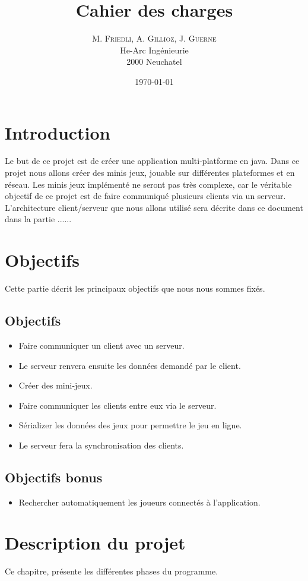 \documentclass{report}
\title{Cahier des charges}
\author{M. \textsc{Friedli}, A. \textsc{Gillioz}, J. \textsc{Guerne}\\
He-Arc Ingénieurie\\
2000 Neuchatel}
\date{\today{}}
\begin{document}
\maketitle{}
\chapter{Introduction}
Le but de ce projet est de créer une application multi-platforme en java. Dans ce projet nous allons créer des minis jeux, jouable sur différentes plateformes et en réseau. Les minis jeux implémenté ne seront pas
très complexe, car le véritable objectif de ce projet est de faire communiqué plusieurs clients via un serveur. L'architecture client/serveur que nous allons utilisé sera décrite dans ce document dans la partie ......
\chapter{Objectifs}
Cette partie décrit les principaux objectifs que nous nous sommes fixés.
\section{Objectifs}\label{objectifs}
\begin{itemize}
	\item Faire communiquer un client avec un serveur.
	\item Le serveur renvera ensuite les données demandé par le client.
	\item Créer des mini-jeux.
	\item Faire communiquer les clients entre eux via le serveur.
	\item Sérializer les données des jeux pour permettre le jeu en ligne.
	\item Le serveur fera la synchronisation des clients.
\end{itemize}
\section{Objectifs bonus}\label{objectifs-bonus}
\begin{itemize}
	\item Rechercher automatiquement les joueurs connectés à l'application.
\end{itemize}
\chapter{Description du projet}
Ce chapitre, présente les différentes phases du programme.
\end{document}
